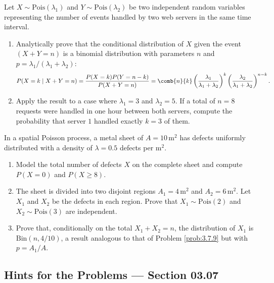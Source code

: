 \begin{problema}
	\label{prob:3.7.9}
	Let $X \sim \text{Pois}(\lambda_{1})$ and $Y \sim \text{Pois}(\lambda_{2})$ be two independent random variables representing the number of events handled by two web servers in the same time interval.
	\begin{enumerate}
		\item Analytically prove that the conditional distribution of $X$ given the event $(X + Y = n)$ is a binomial distribution with parameters $n$ and $p = \lambda_{1} / (\lambda_{1} + \lambda_{2})$:
		\begin{align*}
			P(X = k \mid X + Y = n) = \dfrac{P(X = k) P(Y = n - k)}{P(X + Y = n)} = \comb{n}{k} \left(\dfrac{\lambda_{1}}{\lambda_{1} + \lambda_{2}}\right)^{k} \left(\dfrac{\lambda_{2}}{\lambda_{1} + \lambda_{2}}\right)^{n-k}.
		\end{align*}
		\item Apply the result to a case where $\lambda_{1} = 3$ and $\lambda_{2} = 5$. If a total of $n = 8$ requests were handled in one hour between both servers, compute the probability that server $1$ handled exactly $k = 3$ of them.
	\end{enumerate}
\end{problema}

\begin{problema}
	\label{prob:3.7.10}
	In a spatial Poisson process, a metal sheet of $A = 10\,\text{m}^{2}$ has defects uniformly distributed with a density of $\lambda = 0.5$ defects per $\text{m}^{2}$.
	\begin{enumerate}
		\item Model the total number of defects $X$ on the complete sheet and compute $P(X = 0)$ and $P(X \ge 8)$.
		\item The sheet is divided into two disjoint regions $A_{1} = 4\,\text{m}^{2}$ and $A_{2} = 6\,\text{m}^{2}$. Let $X_{1}$ and $X_{2}$ be the defects in each region. Prove that $X_{1} \sim \text{Pois}(2)$ and $X_{2} \sim \text{Pois}(3)$ are independent.
		\item Prove that, conditionally on the total $X_{1} + X_{2} = n$, the distribution of $X_{1}$ is $\text{Bin}(n, 4/10)$, a result analogous to that of Problem \ref{prob:3.7.9} but with $p = A_{1}/A$.
	\end{enumerate}
\end{problema}

\subsection*{Hints for the Problems --- Section 03.07}

